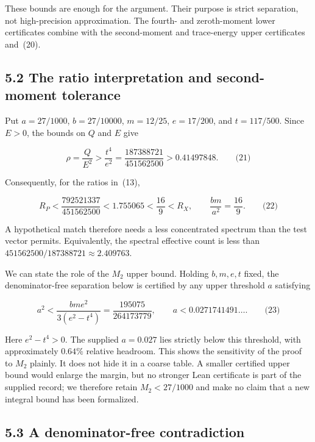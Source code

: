 \documentclass[
  11pt,
]{article}
\begin{document}
These bounds are enough for the argument. Their purpose is strict separation, not high-precision approximation. The fourth- and zeroth-moment lower certificates combine with the second-moment and trace-energy upper certificates and~(20).

\hypertarget{the-ratio-interpretation-and-second-moment-tolerance}{%
\subsection{5.2 The ratio interpretation and second-moment tolerance}\label{the-ratio-interpretation-and-second-moment-tolerance}}

Put \(a = 27/1000\), \(b = 27/10000\), \(m = 12/25\), \(e = 17/200\), and \(t = 117/500\). Since \(E > 0\), the bounds on \(Q\) and \(E\) give

\[\rho = \frac{Q}{E^{2}} > \frac{t^{4}}{e^{2}} = \frac{187388721}{451562500} > 0.41497848.\quad\quad\text{(21)}\]

Consequently, for the ratios in~(13),

\[R_{P} < \frac{792521337}{451562500} < 1.755065 < \frac{16}{9} < R_{X},\quad\quad\frac{bm}{a^{2}} = \frac{16}{9}.\quad\quad\text{(22)}\]

A hypothetical match therefore needs a less concentrated spectrum than the test vector permits. Equivalently, the spectral effective count is less than \(451562500/187388721 \approx 2.409763\).

We can state the role of the \(M_{2}\) upper bound. Holding \(b,m,e,t\) fixed, the denominator-free separation below is certified by any upper threshold \(a\) satisfying

\[a^{2} < \frac{bme^{2}}{3\left( e^{2} - t^{4} \right)} = \frac{195075}{264173779},\quad\quad a < 0.0271741491\ldots.\quad\quad\text{(23)}\]

Here \(e^{2} - t^{4} > 0\). The supplied \(a = 0.027\) lies strictly below this threshold, with approximately \(0.64\%\) relative headroom. This shows the sensitivity of the proof to \(M_{2}\) plainly. It does not hide it in a coarse table. A smaller certified upper bound would enlarge the margin, but no stronger Lean certificate is part of the supplied record; we therefore retain \(M_{2} < 27/1000\) and make no claim that a new integral bound has been formalized.

\hypertarget{a-denominator-free-contradiction}{%
\subsection{5.3 A denominator-free contradiction}\label{a-denominator-free-contradiction}}
\end{document}

